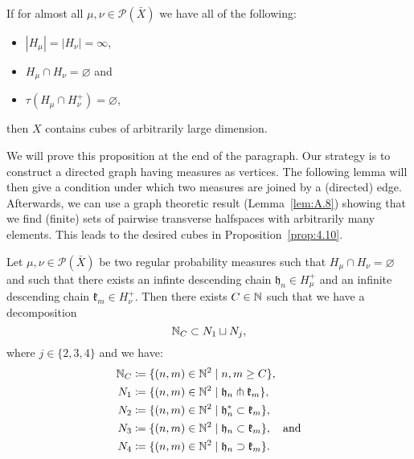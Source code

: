\begin{prop}[{\cite[Proposition~4.10]{MR3509968}}]
  \label{prop:4.10}
  If for almost all \(\mu, \nu \in \mathcal{P}(\bar X)\) we have all of the following:
  \begin{itemize}
  \item \(|H_\mu| = |H_\nu| = \infty\),
  \item \(H_\mu \cap H_\nu = \varnothing\) and
  \item \(\tau(H_\mu \cap H_\nu^+) = \varnothing\),
  \end{itemize}
  then \(X\) contains cubes of arbitrarily large dimension.
\end{prop}

We will prove this proposition at the end of the paragraph. Our strategy is to construct a directed graph having measures as vertices. The following lemma will then give a condition under which two measures are joined by a (directed) edge. Afterwards, we can use a graph theoretic result (Lemma~\ref{lem:A.8}) showing that we find (finite) sets of pairwise transverse halfspaces with arbitrarily many elements. This leads to the desired cubes in Proposition~\ref{prop:4.10}.


\begin{lemma}
  \label{lem:sep-n}
  Let \(\mu, \nu \in \mathcal{P}(\bar X)\) be two regular probability measures such that \(H_\mu \cap H_\nu = \varnothing\) and such that there exists an infinte descending chain \(\mathfrak{h}_n\in H_\mu^+\) and an infinite descending chain \(\mathfrak{k}_m \in H_\nu^+\). Then there exists \(C \in \mathbb{N}\) such that we have a decomposition
  \[
    \mathbb{N}_C \subset N_1 \sqcup N_j,
  \]
  where \(j \in \{2,3,4\}\) and  we have:
  \begin{align*}
    \mathbb{N}_C & \coloneqq \{(n,m) \in \mathbb{N}^2 \mid n,m \geq C\},\\
    N_1 & \coloneqq \{(n,m) \in \mathbb{N}^2 \mid \mathfrak{h}_n \pitchfork \mathfrak{k}_m\},\\
    N_2 & \coloneqq \{(n,m) \in \mathbb{N}^2 \mid \mathfrak{h}_n^\ast \subset \mathfrak{k}_m\},\\
    N_3 & \coloneqq \{(n,m) \in \mathbb{N}^2 \mid \mathfrak{h}_n \subset \mathfrak{k}_m\},\quad \text{and}\\
    N_4 & \coloneqq \{(n,m) \in \mathbb{N}^2 \mid \mathfrak{h}_n \supset \mathfrak{k}_m\}.
  \end{align*}
\end{lemma}


